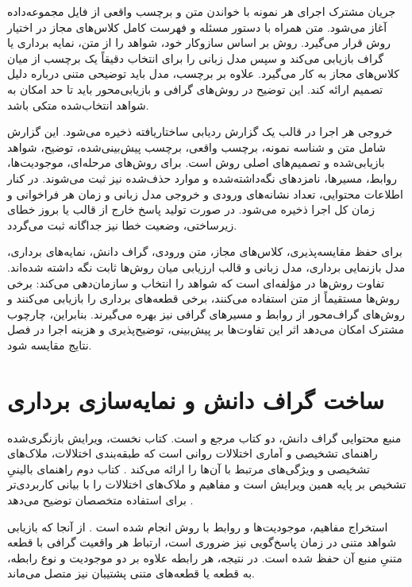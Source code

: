 جریان مشترک اجرای هر نمونه با خواندن متن و برچسب واقعی از فایل مجموعه‌داده آغاز می‌شود. متن همراه با دستور مسئله و فهرست کامل کلاس‌های مجاز در اختیار روش قرار می‌گیرد. روش بر اساس سازوکار خود، شواهد را از متن، نمایه برداری یا گراف بازیابی می‌کند و سپس مدل زبانی را برای انتخاب دقیقاً یک برچسب از میان کلاس‌های مجاز به کار می‌گیرد. علاوه بر برچسب، مدل باید توضیحی متنی درباره دلیل تصمیم ارائه کند. این توضیح در روش‌های گرافی و بازیابی‌محور باید تا حد امکان به شواهد انتخاب‌شده متکی باشد.

خروجی هر اجرا در قالب یک گزارش ردیابی ساختاریافته ذخیره می‌شود. این گزارش شامل متن و شناسه نمونه، برچسب واقعی، برچسب پیش‌بینی‌شده، توضیح، شواهد بازیابی‌شده و تصمیم‌های اصلی روش است. برای روش‌های مرحله‌ای، موجودیت‌ها، روابط، مسیرها، نامزدهای نگه‌داشته‌شده و موارد حذف‌شده نیز ثبت می‌شوند. در کنار اطلاعات محتوایی، تعداد نشانه‌های ورودی و خروجی مدل زبانی و زمان هر فراخوانی و زمان کل اجرا ذخیره می‌شود. در صورت تولید پاسخ خارج از قالب یا بروز خطای زیرساختی، وضعیت خطا نیز جداگانه ثبت می‌گردد.

برای حفظ مقایسه‌پذیری، کلاس‌های مجاز، متن ورودی، گراف دانش، نمایه‌های برداری، مدل بازنمایی برداری، مدل زبانی و قالب ارزیابی میان روش‌ها ثابت نگه داشته شده‌اند. تفاوت روش‌ها در مؤلفه‌ای است که شواهد را انتخاب و سازمان‌دهی می‌کند: برخی روش‌ها مستقیماً از متن استفاده می‌کنند، برخی قطعه‌های برداری را بازیابی می‌کنند و روش‌های گراف‌محور از روابط و مسیرهای گرافی نیز بهره می‌گیرند. بنابراین، چارچوب مشترک امکان می‌دهد اثر این تفاوت‌ها بر پیش‌بینی، توضیح‌پذیری و هزینه اجرا در فصل نتایج مقایسه شود.

\section{ساخت گراف دانش و نمایه‌سازی برداری}

منبع محتوایی گراف دانش، دو کتاب مرجع  و  است. کتاب نخست، ویرایش بازنگری‌شده راهنمای تشخیصی و آماری اختلالات روانی است که طبقه‌بندی اختلالات، ملاک‌های تشخیصی و ویژگی‌های مرتبط با آن‌ها را ارائه می‌کند \cite{apa2022dsm5tr}. کتاب دوم راهنمای بالینیِ تشخیص بر پایه همین ویرایش است و مفاهیم و ملاک‌های اختلالات را با بیانی کاربردی‌تر برای استفاده متخصصان توضیح می‌دهد \cite{morrison2022dsm5trmadeeasy}.

استخراج مفاهیم، موجودیت‌ها و روابط با روش  انجام شده است \cite{mo2025kggen}. از آنجا که بازیابی شواهد متنی در زمان پاسخ‌گویی نیز ضروری است، ارتباط هر واقعیت گرافی با قطعه متنیِ منبع آن حفظ شده است. در نتیجه، هر رابطه علاوه بر دو موجودیت و نوع رابطه، به قطعه یا قطعه‌های متنی پشتیبان نیز متصل می‌ماند.

